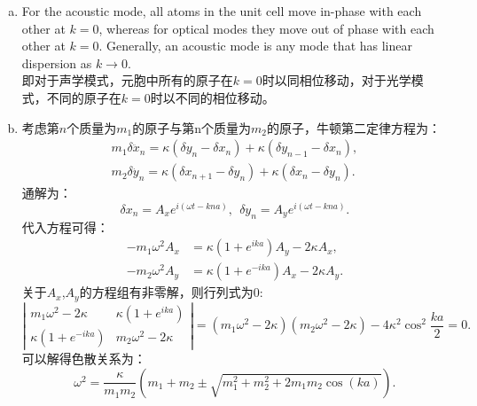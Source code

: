 \documentclass[reqno,a4paper,12pt]{amsart}
\begin{document}
\begin{tcolorbox}[breakable, colback = black!5!white, colframe = black]
\begin{enumerate}[(a)]
\item For the acoustic mode, all atoms in the unit cell move in-phase with each other at $k = 0$, whereas for optical modes they move out of phase with each other at $k = 0$. Generally, an acoustic mode is any mode that has linear dispersion as $k \to 0$.\\
即对于声学模式，元胞中所有的原子在$k=0$时以同相位移动，对于光学模式，不同的原子在$k=0$时以不同的相位移动。

\item 考虑第$n$个质量为$m_1$的原子与第n个质量为$m_2$的原子，牛顿第二定律方程为：
\begin{align*}
	m_1\delta\ddot{x}_n = \kappa(\delta y_n - \delta x_n) + \kappa(\delta y_{n-1} - \delta x_n), \\
	m_2\delta\ddot{y}_n = \kappa(\delta x_{n+1} - \delta y_n) + \kappa(\delta x_n - \delta y_n).
\end{align*}
通解为：
\[
	\delta x_n = A_x e^{i(\omega t - kna)}, ~~ \delta y_n = A_y e^{i(\omega t - kna)}.
\]
代入方程可得：
\begin{align*}
	-m_1\omega^2A_x &= \kappa(1+e^{ika}) A_y - 2\kappa A_x, \\
	-m_2\omega^2A_y &= \kappa(1+e^{-ika}) A_x - 2\kappa A_y.
\end{align*}
关于$A_x$,$A_y$的方程组有非零解，则行列式为0:
\[
	\left\vert \begin{matrix}
		m_1\omega^2-2\kappa & \kappa(1+e^{ika}) \\
		\kappa(1+e^{-ika}) & m_2\omega^2-2\kappa
	\end{matrix}\right\vert = (m_1\omega^2 - 2\kappa)(m_2\omega^2 - 2\kappa) - 4\kappa^2\cos^2\frac{ka}{2} = 0.
\]
可以解得色散关系为：
\[
	\omega^2 = \frac{\kappa}{m_1m_2}(m_1+m_2 \pm \sqrt{m_1^2+m_2^2 + 2m_1m_2\cos(ka)}).
\]


\end{enumerate}
\end{tcolorbox}
\end{document}
